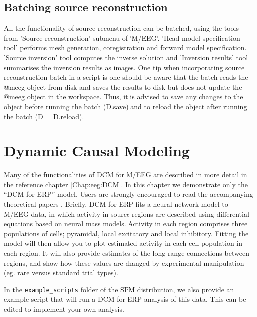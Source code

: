 \subsection{Batching source reconstruction}
All the functionality of source reconstruction can be batched, using the tools from 'Source reconstruction' submenu of 'M/EEG'. 'Head model specification tool' performs mesh generation, coregistration and forward model specification. 'Source inversion' tool computes the inverse solution and 'Inversion results' tool summarises the inversion results as images. One tip when incorporating source reconstruction batch in a script is one should be aware that the batch reads the @meeg object from disk and saves the results to disk but does not update the @meeg object in the workspace. Thus, it is advised to save any changes to the object before running the batch (D.save) and to reload the object after running the batch (D = D.reload). 

\section{Dynamic Causal Modeling}

Many of the functionalities of DCM for M/EEG are described in more detail in the reference chapter \ref{Chap:eeg:DCM}. In this chapter we demonstrate only the ``DCM for ERP'' model. 
Users are strongly encouraged to read the accompanying theoretical papers \cite{od_dcm_erp,sjk_dcm_erp}. Briefly, DCM for ERP fits a  neural network model to M/EEG data, in which activity in source regions are described using differential equations based on neural mass models. Activity in each region comprises three populations of cells; pyramidal, local excitatory and local inhibitory. Fitting the model will then allow you to plot estimated activity in each cell population in each region. It will also provide estimates of the long range connections between regions, and show how these values are changed by experimental manipulation (eg. rare versus standard trial types).
  
In the \texttt{example\_scripts} folder of the SPM distribution, we also provide an example script that will run a DCM-for-ERP analysis of this data. This can be edited to implement your own analysis.

